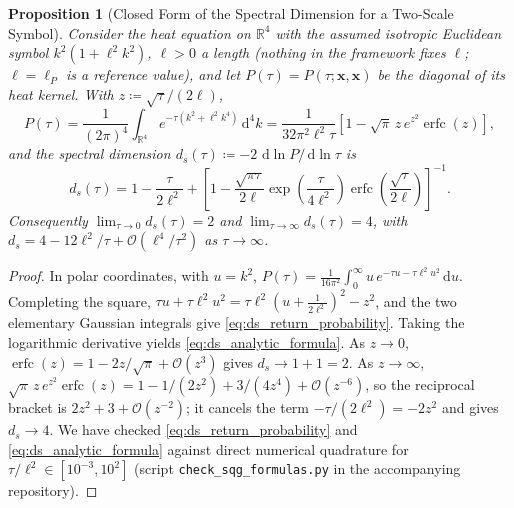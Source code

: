 \documentclass[11pt,a4paper,reqno]{amsart}
\newtheorem{proposition}[theorem]{Proposition}
\theoremstyle{definition}
\numberwithin{equation}{section}
\newcommand{\R}{\mathbb{R}}
\newcommand{\dif}{\,\mathrm{d}}
\begin{document}
\begin{proposition}[Closed Form of the Spectral Dimension for a Two-Scale Symbol]
\label{thm:spectral_dimension_flow}
Consider the heat equation on $\R^4$ with the \emph{assumed} isotropic Euclidean symbol $k^2(1 + \ell^2 k^2)$, $\ell > 0$ a length (nothing in the framework fixes $\ell$; $\ell = \ell_P$ is a reference value), and let $P(\tau) = P(\tau; \mathbf{x}, \mathbf{x})$ be the diagonal of its heat kernel. With $z \coloneqq \sqrt{\tau}/(2\ell)$,
\begin{equation}
    \label{eq:ds_return_probability}
    P(\tau) = \frac{1}{(2\pi)^4} \int_{\R^4} e^{-\tau (k^2 + \ell^2 k^4)} \dif^4 k = \frac{1}{32 \pi^2 \ell^2 \tau} \left[ 1 - \sqrt{\pi}\, z\, e^{z^2} \operatorname{erfc}(z) \right],
\end{equation}
and the spectral dimension $d_s(\tau) \coloneqq -2\, \dif \ln P / \dif \ln \tau$ is
\begin{equation}
    \label{eq:ds_analytic_formula}
    d_s(\tau) = 1 - \frac{\tau}{2\ell^2} + \left[ 1 - \frac{\sqrt{\pi \tau}}{2\ell} \exp\!\left(\frac{\tau}{4\ell^2}\right) \operatorname{erfc}\!\left(\frac{\sqrt{\tau}}{2\ell}\right) \right]^{-1}.
\end{equation}
Consequently $\lim_{\tau \to 0} d_s(\tau) = 2$ and $\lim_{\tau \to \infty} d_s(\tau) = 4$, with $d_s = 4 - 12\ell^2/\tau + \mathcal{O}(\ell^4/\tau^2)$ as $\tau \to \infty$.
\end{proposition}
\begin{proof}
In polar coordinates, with $u = k^2$, $P(\tau) = \frac{1}{16\pi^2} \int_0^\infty u\, e^{-\tau u - \tau \ell^2 u^2} \dif u$. Completing the square, $\tau u + \tau \ell^2 u^2 = \tau\ell^2 (u + \frac{1}{2\ell^2})^2 - z^2$, and the two elementary Gaussian integrals give \eqref{eq:ds_return_probability}. Taking the logarithmic derivative yields \eqref{eq:ds_analytic_formula}. As $z \to 0$, $\operatorname{erfc}(z) = 1 - 2z/\sqrt{\pi} + \mathcal{O}(z^3)$ gives $d_s \to 1 + 1 = 2$. As $z \to \infty$, $\sqrt{\pi}\, z\, e^{z^2} \operatorname{erfc}(z) = 1 - 1/(2z^2) + 3/(4z^4) + \mathcal{O}(z^{-6})$, so the reciprocal bracket is $2z^2 + 3 + \mathcal{O}(z^{-2})$; it cancels the term $-\tau/(2\ell^2) = -2z^2$ and gives $d_s \to 4$. We have checked \eqref{eq:ds_return_probability} and \eqref{eq:ds_analytic_formula} against direct numerical quadrature for $\tau/\ell^2 \in [10^{-3}, 10^2]$ (script \texttt{check\_\allowbreak sqg\_\allowbreak formulas.py} in the accompanying repository).
\end{proof}
\end{document}
